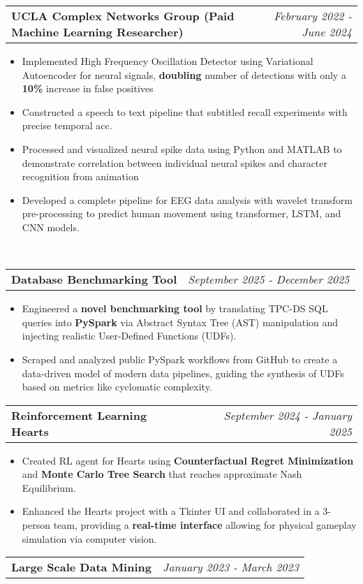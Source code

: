 \documentclass[letterpaper,11pt]{article}
\makeatletter
\newcommand{\resitem}[1]{\item #1 \vspace{-8pt}}
\newcommand{\resheading}[1]{\vspace{8pt}{\Large \textbf{#1}}\\\vspace{-8pt}\hrulefill}
\newcommand{\ressubheadingsmol}[2]{\vspace{1pt}
\begin{tabular*}{7.0in}{l@{\cftdotfill{\cftsecdotsep}\extracolsep{\fill}}r}
		\textbf{#1} & \textit{#2} \\
\end{tabular*}\vspace{-6pt}}
\makeatother
\begin{document}
\ressubheadingsmol{UCLA Complex Networks Group (Paid Machine Learning Researcher)}{February 2022 - June 2024}
\begin{itemize}
    \resitem{Implemented High Frequency Oscillation Detector using Variational Autoencoder for neural signals, \textbf{doubling} number of detections with only a \textbf{10\%} increase in false positives}
    \resitem{Constructed a speech to text pipeline that subtitled recall experiments with precise temporal acc.}
    \resitem{Processed and visualized neural spike data using Python and MATLAB to demonstrate correlation between individual neural spikes and character recognition from animation}
    \resitem{Developed a complete pipeline for EEG data analysis with wavelet transform pre-processing to predict human movement using transformer, LSTM, and CNN models.}

\end{itemize}


\resheading{Projects}
\ressubheadingsmol{Database Benchmarking Tool}{September 2025 - December 2025}
\begin{itemize}
    \resitem{Engineered a\textbf{ novel benchmarking tool} by translating TPC-DS SQL queries into \textbf{PySpark} via Abstract Syntax Tree (AST) manipulation and injecting realistic User-Defined Functions (UDFs).}
    \resitem{Scraped and analyzed public PySpark workflows from GitHub to create a data-driven model of modern data pipelines, guiding the synthesis of UDFs based on metrics like cyclomatic complexity.}
\end{itemize}
\ressubheadingsmol{Reinforcement Learning Hearts}{September 2024 - January 2025}
\begin{itemize}
    \resitem{Created RL agent for Hearts using \textbf{Counterfactual Regret Minimization} and \textbf{Monte Carlo Tree Search} that reaches approximate Nash Equilibrium.}
    \resitem{Enhanced the Hearts project with a Tkinter UI and collaborated in a 3-person team, providing a \textbf{real-time interface} allowing for physical gameplay simulation via computer vision.}
\end{itemize}


\ressubheadingsmol{Large Scale Data Mining}{January 2023 - March 2023}
\end{document}
